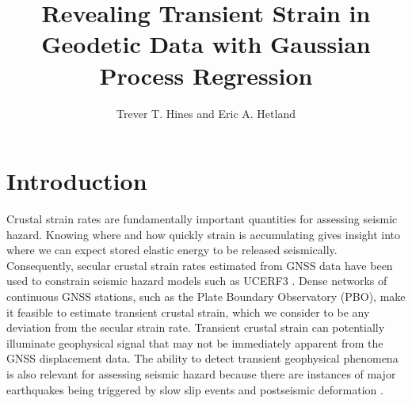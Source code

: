 \documentclass[10pt,letter]{article}
\title{Revealing Transient Strain in Geodetic Data with Gaussian Process Regression}
\author{Trever T. Hines and Eric A. Hetland}
\begin{document}
\maketitle

\doublespacing

\section{Introduction}\label{sec:Introduction}
Crustal strain rates are fundamentally important quantities for assessing seismic hazard. Knowing where and how quickly strain is accumulating gives insight into where we can expect stored elastic energy to be released seismically. Consequently, secular crustal strain rates estimated from GNSS data have been used to constrain seismic hazard models such as UCERF3 \citep{Field2014}. Dense networks of continuous GNSS stations, such as the Plate Boundary Observatory (PBO), make it feasible to estimate transient crustal strain, which we consider to be any deviation from the secular strain rate.  Transient crustal strain can potentially illuminate geophysical signal that may not be immediately apparent from the GNSS displacement data. The ability to detect transient geophysical phenomena is also relevant for assessing seismic hazard because there are instances of major earthquakes being triggered by slow slip events \citep{Roeloffs2006} and postseismic deformation \citep{Freed2001}. 
\end{document}

